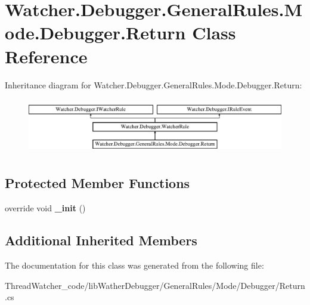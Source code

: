 \hypertarget{class_watcher_1_1_debugger_1_1_general_rules_1_1_mode_1_1_debugger_1_1_return}{\section{Watcher.\+Debugger.\+General\+Rules.\+Mode.\+Debugger.\+Return Class Reference}
\label{class_watcher_1_1_debugger_1_1_general_rules_1_1_mode_1_1_debugger_1_1_return}
}
Inheritance diagram for Watcher.\+Debugger.\+General\+Rules.\+Mode.\+Debugger.\+Return\+:\begin{figure}[H]
\begin{center}
\leavevmode
\includegraphics[height=2.441860cm]{class_watcher_1_1_debugger_1_1_general_rules_1_1_mode_1_1_debugger_1_1_return}
\end{center}
\end{figure}
\subsection*{Protected Member Functions}
\begin{DoxyCompactItemize}
\item 
\hypertarget{class_watcher_1_1_debugger_1_1_general_rules_1_1_mode_1_1_debugger_1_1_return_aca0b4896f549b16883609c42b1c98198}{override void {\bfseries \+\_\+init} ()}\label{class_watcher_1_1_debugger_1_1_general_rules_1_1_mode_1_1_debugger_1_1_return_aca0b4896f549b16883609c42b1c98198}

\end{DoxyCompactItemize}
\subsection*{Additional Inherited Members}


The documentation for this class was generated from the following file\+:\begin{DoxyCompactItemize}
\item 
Thread\+Watcher\+\_\+code/lib\+Wather\+Debugger/\+General\+Rules/\+Mode/\+Debugger/Return.\+cs\end{DoxyCompactItemize}
